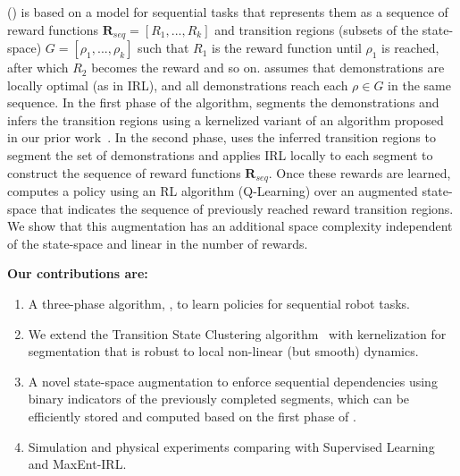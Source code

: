 \hirlfull (\hirl) is based on a model for sequential tasks that represents them as a sequence of reward functions $\mathbf{R}_{seq}=[R_1,...,R_k]$ and transition regions (subsets of the state-space) $G = [\rho_1, ...,\rho_k]$ such that $R_1$ is the reward function until $\rho_1$ is reached, after which $R_2$ becomes the reward and so on.
\hirl assumes that demonstrations are locally optimal (as in IRL), and all demonstrations reach each $\rho \in G$ in the same sequence.
In the first phase of the algorithm, \hirl segments the demonstrations and infers the transition regions using a kernelized variant of an algorithm proposed in our prior work~\cite{krishnan2015tsc,murali2016}.
In the second phase, \hirl uses the inferred transition regions to segment the set of demonstrations and applies IRL locally to each segment to construct the sequence of reward functions $\mathbf{R}_{seq}$.
Once these rewards are learned, \hirl computes a policy using an RL algorithm (Q-Learning) over an augmented state-space that indicates the sequence of previously reached reward transition regions. We show that this augmentation has an additional space complexity independent of the state-space and linear in the number of rewards.

\vspace{3pt}
\noindent \textbf{Our contributions are:}
\begin{enumerate}[
    topsep=0pt,
    noitemsep,
    leftmargin=*,
    ]
\item A three-phase algorithm, \hirl, to learn policies for sequential robot tasks.
\item We extend the Transition State Clustering algorithm~\cite{krishnan2015tsc,murali2016} with kernelization for segmentation that is robust to local non-linear (but smooth) dynamics.
\item A novel state-space augmentation to enforce sequential dependencies using binary indicators of the previously completed segments, which can be efficiently stored and computed based on the first phase of \hirl.
\item Simulation and physical experiments comparing \hirl with Supervised Learning and MaxEnt-IRL.
\end{enumerate}




